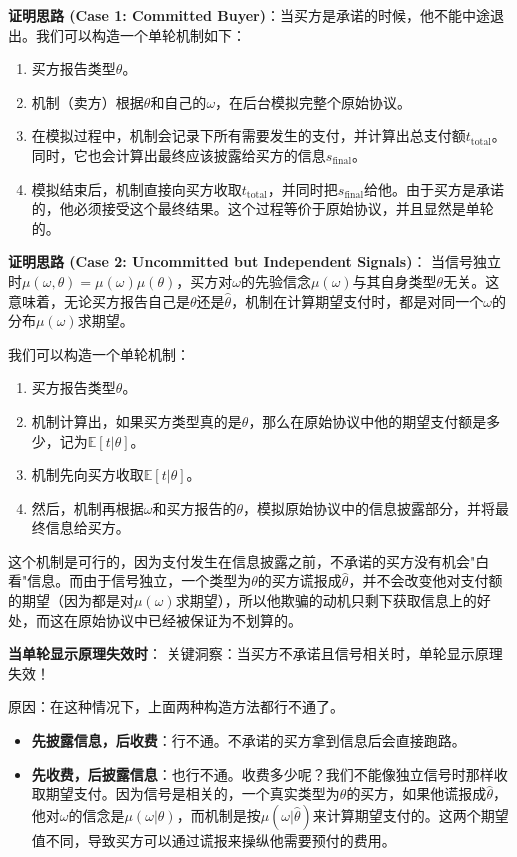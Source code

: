 \textbf{证明思路 (Case 1: Committed Buyer)}：当买方是承诺的时候，他不能中途退出。我们可以构造一个单轮机制如下：
\begin{enumerate}
    \item 买方报告类型$\theta$。
    \item 机制（卖方）根据$\theta$和自己的$\omega$，在后台模拟完整个原始协议。
    \item 在模拟过程中，机制会记录下所有需要发生的支付，并计算出总支付额$t_{\text{total}}$。同时，它也会计算出最终应该披露给买方的信息$s_{\text{final}}$。
    \item 模拟结束后，机制直接向买方收取$t_{\text{total}}$，并同时把$s_{\text{final}}$给他。由于买方是承诺的，他必须接受这个最终结果。这个过程等价于原始协议，并且显然是单轮的。
\end{enumerate}

\textbf{证明思路 (Case 2: Uncommitted but Independent Signals)}：
当信号独立时$\mu(\omega,\theta)=\mu(\omega)\mu(\theta)$，买方对$\omega$的先验信念$\mu(\omega)$与其自身类型$\theta$无关。这意味着，无论买方报告自己是$\theta$还是$\hat{\theta}$，机制在计算期望支付时，都是对同一个$\omega$的分布$\mu(\omega)$求期望。

我们可以构造一个单轮机制：
\begin{enumerate}
    \item 买方报告类型$\theta$。
    \item 机制计算出，如果买方类型真的是$\theta$，那么在原始协议中他的期望支付额是多少，记为$\mathbb{E}[t|\theta]$。
    \item 机制先向买方收取$\mathbb{E}[t|\theta]$。
    \item 然后，机制再根据$\omega$和买方报告的$\theta$，模拟原始协议中的信息披露部分，并将最终信息给买方。
\end{enumerate}

这个机制是可行的，因为支付发生在信息披露之前，不承诺的买方没有机会"白看"信息。而由于信号独立，一个类型为$\theta$的买方谎报成$\hat{\theta}$，并不会改变他对支付额的期望（因为都是对$\mu(\omega)$求期望），所以他欺骗的动机只剩下获取信息上的好处，而这在原始协议中已经被保证为不划算的。

\textbf{当单轮显示原理失效时}：
关键洞察：当买方不承诺且信号相关时，单轮显示原理失效！

原因：在这种情况下，上面两种构造方法都行不通了。
\begin{itemize}
    \item \textbf{先披露信息，后收费}：行不通。不承诺的买方拿到信息后会直接跑路。
    \item \textbf{先收费，后披露信息}：也行不通。收费多少呢？我们不能像独立信号时那样收取期望支付。因为信号是相关的，一个真实类型为$\theta$的买方，如果他谎报成$\hat{\theta}$，他对$\omega$的信念是$\mu(\omega|\theta)$，而机制是按$\mu(\omega|\hat{\theta})$来计算期望支付的。这两个期望值不同，导致买方可以通过谎报来操纵他需要预付的费用。
\end{itemize}

